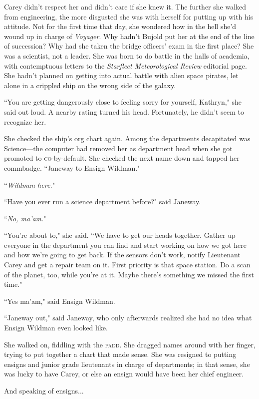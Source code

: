 \documentclass[twoside,letterpaper,12pt]{memoir}
\begin{document}
Carey didn't respect her and didn't care if she knew it. The further she walked from engineering, the more disgusted she was with herself for putting up with his attitude. Not for the first time that day, she wondered how in the hell she'd wound up in charge of \textit{Voyager}. Why hadn't Bujold put her at the end of the line of succession? Why had she taken the bridge officers' exam in the first place? She was a scientist, not a leader. She was born to do battle in the halls of academia, with contemptuous letters to the \textit{Starfleet Meteorological Review} editorial page. She hadn't planned on getting into actual battle with alien space pirates, let alone in a crippled ship on the wrong side of the galaxy.

``You are getting dangerously close to feeling sorry for yourself, Kathryn," she said out loud. A nearby rating turned his head. Fortunately, he didn't seem to recognize her.

She checked the ship's org chart again. Among the departments decapitated was Science---the computer had removed her as department head when she got promoted to \textsc{co}-by-default. She checked the next name down and tapped her commbadge. ``Janeway to Ensign Wildman."

``\textit{Wildman here.}"

``Have you ever run a science department before?" said Janeway.

``\textit{No, ma'am.}"

``You're about to," she said. ``We have to get our heads together. Gather up everyone in the department you can find and start working on how we got here and how we're going to get back. If the sensors don't work, notify Lieutenant Carey and get a repair team on it. First priority is that space station. Do a scan of the planet, too, while you're at it. Maybe there's something we missed the first time."

``Yes ma'am," said Ensign Wildman.

``Janeway out," said Janeway, who only afterwards realized she had no idea what Ensign Wildman even looked like.

She walked on, fiddling with the \textsc{padd}. She dragged names around with her finger, trying to put together a chart that made sense. She was resigned to putting ensigns and junior grade lieutenants in charge of departments; in that sense, she was lucky to have Carey, or else an ensign would have been her chief engineer.

And speaking of ensigns...
\end{document}
